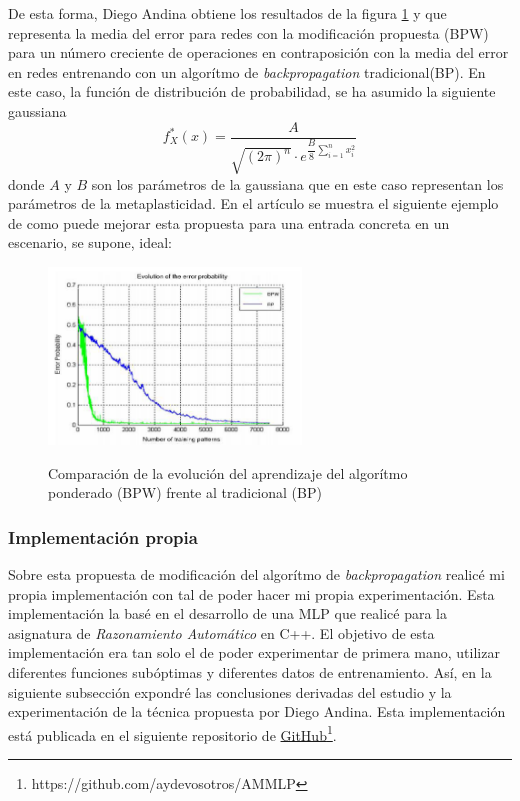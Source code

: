 \documentclass[10pt,a4paper]{report}
\begin{document}
De esta forma, Diego Andina obtiene los resultados de la figura \ref{fig:andinaResults} y que representa la media del error para redes con la modificación propuesta (BPW) para un número creciente de operaciones en contraposición con la media del error en redes entrenando con un algorítmo de \textit{backpropagation} tradicional(BP). En este caso, la función de distribución de probabilidad, se ha asumido la siguiente gaussiana
\begin{equation}
	f^*_X(x) = \dfrac{A}{\sqrt{(2\pi)^n} \cdot e^{\dfrac{B}{8} \sum_{i=1}^n{x_i^2}}}
\end{equation}
donde $A$ y $B$ son los parámetros de la gaussiana que en este caso representan los parámetros de la metaplasticidad. En el artículo\citep{Andina2009} se muestra el siguiente ejemplo de como puede mejorar esta propuesta para una entrada concreta en un escenario, se supone, ideal:

\begin{figure}[h!]{}
    \centering
    \includegraphics[width=0.6\textwidth]{img/ArticleResults.png}
    \label{fig:andinaResults}
    \caption{Comparación de la evolución del aprendizaje del algorítmo ponderado (BPW) frente al tradicional (BP)}
\end{figure}

\subsubsection{Implementación propia}
Sobre esta propuesta de modificación del algorítmo de \textit{backpropagation} realicé mi propia implementación con tal de poder hacer mi propia experimentación. Esta implementación la basé en el desarrollo de una MLP que realicé para la asignatura de \textit{Razonamiento Automático} en C++. El objetivo de esta implementación era tan solo el de poder experimentar de primera mano, utilizar diferentes funciones subóptimas y diferentes datos de entrenamiento. 
Así, en la siguiente subsección expondré las conclusiones derivadas del estudio y la experimentación de la técnica propuesta por Diego Andina.
 Esta implementación está publicada en el siguiente repositorio de \href{https://github.com/aydevosotros/AMMLP}{GitHub}\footnote{https://github.com/aydevosotros/AMMLP}.
\end{document}
